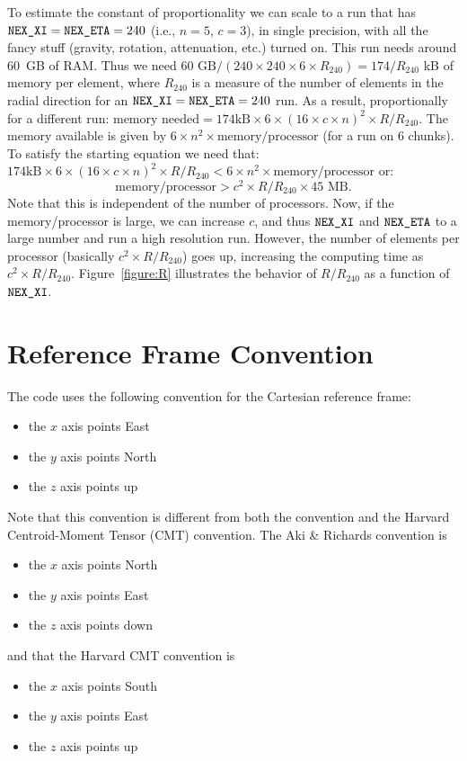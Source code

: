 \documentclass[onecolumn]{article}
\newcommand{\nexxi}{\mbox{\texttt{NEX\_XI}}}
\newcommand{\nexeta}{\mbox{\texttt{NEX\_ETA}}}
\begin{document}
To estimate the constant of proportionality we can scale to a run
that has $\nexxi=\nexeta=240$ (i.e., $n=5$, $c=3$), in single precision,
with all the fancy stuff (gravity, rotation, attenuation, etc.) turned on.
This run needs around 60~GB of RAM.
Thus we need $\mbox{60~GB}/(240\times 240\times 6\times R_{240})=174/R_{240}$ kB
of memory per element,
where $R_{240}$ is a measure of the number of elements in the radial
direction for an $\nexxi=\nexeta=240$ run.
As a result, proportionally for a different run:
$\mbox{memory needed}=174 \mbox{kB}\times 6\times (16\times c\times n)^2 \times R/R_{240}$.
The memory available is given by $6\times n^2\times\mbox{memory/processor}$
(for a run on 6 chunks).
To satisfy the starting equation we need that:
$174\mbox{kB}\times 6\times (16\times c\times n)^2 \times R/R_{240}
< 6\times n^2\times \mbox{memory/processor}$
or:
\begin{equation}
\mbox{memory/processor} > c^2 \times R/R_{240}\times \mbox{45~MB}.
\end{equation}
Note that this is independent of the number of processors.
Now, if the memory/processor is large, we can increase $c$, and thus $\nexxi$ and $\nexeta$
to a large number and run a high resolution run.
However, the number of elements per processor
(basically $c^2 \times R/R_{240}$) goes up,
increasing the computing time as $c^2\times R/R_{240}$.
Figure~\ref{figure:R} illustrates the behavior of
$R/R_{240}$ as a function of $\nexxi$.

\section{Reference Frame Convention}
\label{appendix:coordinates}

The code uses the following convention for the Cartesian reference frame:
\begin{itemize}
\item the $x$ axis points East
\item the $y$ axis points North
\item the $z$ axis points up
\end{itemize}
Note that this convention is different from both the \cite{AkRi80} convention
and the Harvard Centroid-Moment Tensor (CMT) convention.
The Aki \& Richards convention is
\begin{itemize}
\item the $x$ axis points North
\item the $y$ axis points East
\item the $z$ axis points down
\end{itemize}
and that the Harvard CMT convention is
\begin{itemize}
\item the $x$ axis points South
\item the $y$ axis points East
\item the $z$ axis points up
\end{itemize}
\end{document}
